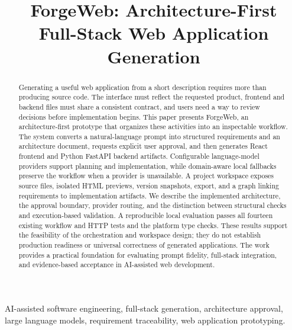 \documentclass[conference,a4paper]{IEEEtran}
\begin{document}
\title{ForgeWeb: Architecture-First\\Full-Stack Web Application Generation}
\author{
}
\maketitle

\begin{abstract}
Generating a useful web application from a short description requires more than producing source code. The interface must reflect the requested product, frontend and backend files must share a consistent contract, and users need a way to review decisions before implementation begins. This paper presents ForgeWeb, an architecture-first prototype that organizes these activities into an inspectable workflow. The system converts a natural-language prompt into structured requirements and an architecture document, requests explicit user approval, and then generates React frontend and Python FastAPI backend artifacts. Configurable language-model providers support planning and implementation, while domain-aware local fallbacks preserve the workflow when a provider is unavailable. A project workspace exposes source files, isolated HTML previews, version snapshots, export, and a graph linking requirements to implementation artifacts. We describe the implemented architecture, the approval boundary, provider routing, and the distinction between structural checks and execution-based validation. A reproducible local evaluation passes all fourteen existing workflow and HTTP tests and the platform type checks. These results support the feasibility of the orchestration and workspace design; they do not establish production readiness or universal correctness of generated applications. The work provides a practical foundation for evaluating prompt fidelity, full-stack integration, and evidence-based acceptance in AI-assisted web development.
\end{abstract}

\begin{IEEEkeywords}
AI-assisted software engineering, full-stack generation, architecture approval, large language models, requirement traceability, web application prototyping.
\end{IEEEkeywords}
\end{document}
